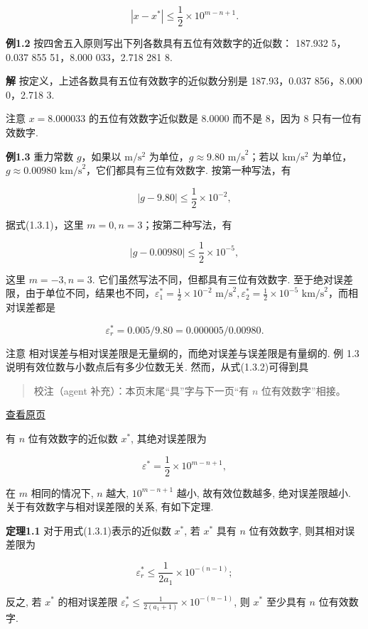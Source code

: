\documentclass[
  10pt,
  fontset=fandol]{ctexart}
\begin{document}
\[
|x - x^*| \leqslant \frac{1}{2} \times 10^{m-n+1}. \tag{1.3.2}
\]

\textbf{例1.2} 按四舍五入原则写出下列各数具有五位有效数字的近似数： 187.932 5，0.037 855 51，8.000 033，2.718 281 8.

\textbf{解} 按定义，上述各数具有五位有效数字的近似数分别是 187.93，0.037 856，8.000 0，2.718 3.

注意 \(x = 8.000033\) 的五位有效数字近似数是 8.0000 而不是 8，因为 8 只有一位有效数字.

\textbf{例1.3} 重力常数 \(g\)，如果以 \(\mathrm{m/s^2}\) 为单位，\(g \approx 9.80 \text{ m/s}^2\)；若以 \(\mathrm{km/s^2}\) 为单位，\(g \approx 0.00980 \text{ km/s}^2\)，它们都具有三位有效数字. 按第一种写法，有

\[
|g - 9.80| \leqslant \frac{1}{2} \times 10^{-2},
\]

据式(1.3.1)，这里 \(m=0, n=3\)；按第二种写法，有

\[
|g - 0.00980| \leqslant \frac{1}{2} \times 10^{-5},
\]

这里 \(m=-3, n=3\). 它们虽然写法不同，但都具有三位有效数字. 至于绝对误差限，由于单位不同，结果也不同，\(\varepsilon_1^* = \frac{1}{2} \times 10^{-2} \text{ m/s}^2,\allowbreak  \varepsilon_2^* = \frac{1}{2} \times 10^{-5} \text{ km/s}^2\)，而相对误差都是

\[
\varepsilon_r^* = 0.005/9.80 = 0.000005/0.00980.
\]

注意 相对误差与相对误差限是无量纲的，而绝对误差与误差限是有量纲的. 例 1.3 说明有效位数与小数点后有多少位数无关. 然而，从式(1.3.2)可得到具

\begin{quote}
校注（agent 补充）：本页末尾``具''字与下一页``有 \(n\) 位有效数字''相接。
\end{quote}

\href{../../source-images/pdf-020.jpeg}{查看原页}

有 \(n\) 位有效数字的近似数 \(x^*\), 其绝对误差限为

\[
\varepsilon^* = \frac{1}{2} \times 10^{m-n+1},
\]

在 \(m\) 相同的情况下, \(n\) 越大, \(10^{m-n+1}\) 越小, 故有效位数越多, 绝对误差限越小. 关于有效数字与相对误差限的关系, 有如下定理.

\textbf{定理1.1} 对于用式(1.3.1)表示的近似数 \(x^*\), 若 \(x^*\) 具有 \(n\) 位有效数字, 则其相对误差限为

\[
\varepsilon_r^* \leqslant \frac{1}{2a_1} \times 10^{-(n-1)};
\]

反之, 若 \(x^*\) 的相对误差限 \(\varepsilon_r^* \leqslant \frac{1}{2(a_1+1)} \times 10^{-(n-1)}\), 则 \(x^*\) 至少具有 \(n\) 位有效数字.
\end{document}
